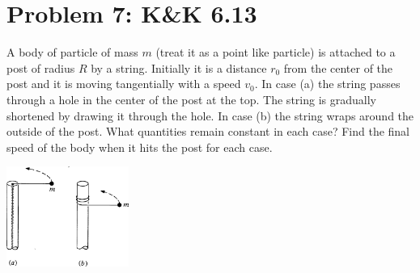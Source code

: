 \documentclass[problems]{esg8012pset}
\begin{document}
\section*{Problem 7: K\&K 6.13}
  A body of particle of mass $m$ (treat it as a point like particle) is attached to a post of radius $R$ by a string. Initially it is a distance $r_0$ from the center of the post and it is moving tangentially with a speed $v_0$. In case (a) the string passes through a hole in the center of the post at the top. The string is gradually shortened by drawing it through the hole. In case (b) the string wraps around the outside of the post. What quantities remain constant in each case? Find the final speed of the body when it hits the post for each case.
  \begin{center}\includegraphics[width=0.3\textwidth]{ps08_5}\end{center}
\end{document}
